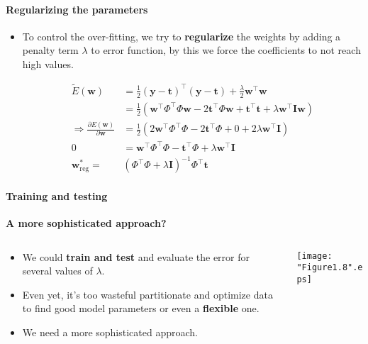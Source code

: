 \begin{frame}{\insertsubsection}
	\framesubtitle{Regularizing the parameters}
		\begin{itemize}
		\item To control the over-fitting, we try to \textcolor{UniOrange}{\textbf{regularize}} the weights by adding a penalty term $\lambda$ to error function, by this we force the coefficients to not reach high values.

		
				\begin{align*}
					\tilde{E}(\mathbf{w}) &=\frac{1}{2} (\mathbf{y}-\mathbf{t})^{\top}(\mathbf{y}-\mathbf{t}) +\frac{\lambda}{2} \mathbf{w}^{\top}\mathbf{w} \\
									   &= \frac{1}{2} \left( \mathbf{w}^{\top} \Phi^{\top} \Phi \mathbf{w} -  2\mathbf{t}^{\top} \Phi \mathbf{w} + \mathbf{t}^{\top}\mathbf{t} + \lambda \mathbf{w}^{\top}\mathbf{I}\mathbf{w} \right) \\
			\Rightarrow \frac{\partial E(\mathbf{w})}{\partial \mathbf{w}} &= \frac{1}{2} \left( 2 \mathbf{w}^{\top} \Phi^{\top} \Phi  -  2\mathbf{t}^{\top} \Phi + 0 + 2 \lambda \mathbf{w}^{\top} \mathbf{I} \right) \\
					0 &=  \mathbf{w}^{\top} \Phi^{\top} \Phi  -  \mathbf{t}^{\top} \Phi + \lambda \mathbf{w}^{\top} \mathbf{I} \\
					 \mathbf{w}^*_\text{reg} = & \left( \Phi^{\top} \Phi + \lambda \mathbf{I} \right)^{-1} \Phi^{\top} \mathbf{t}
		\end{align*}			
		\end{itemize}
\end{frame}

%	


\begin{frame}{\insertsubsection}
	\framesubtitle{Training and testing}
	\textcolor{UniGold}{\textbf{A more sophisticated approach?}}
	\begin{columns}
		\begin{column}{0.475\textwidth}
			\begin{itemize}	
			\item We could \textcolor{UniOrange}{\textbf{train and test}} and evaluate the error for several values of $\lambda$.
			\item Even yet, it's too wasteful partitionate and optimize data to find good model parameters or even a \textcolor{UniOrange}{\textbf{flexible}} one.
			\item We need a more sophisticated approach.
			\end{itemize}
		\end{column}
		\begin{column}{0.475\textwidth}
			\begin{center}
			\centering
			\label{fig:Erms-reg}
			\texttt{[image: "Figure1.8".eps]}
			\end{center}
		\end{column}
	\end{columns}		
	\end{frame}

